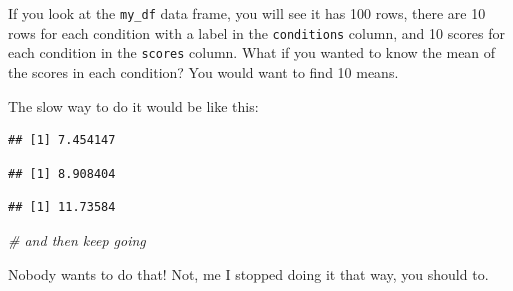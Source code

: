 \documentclass[
]{book}
\newenvironment{Shaded}{\begin{snugshade}}{\end{snugshade}}
\newcommand{\CommentTok}[1]{\textcolor[rgb]{0.56,0.35,0.01}{\textit{#1}}}
\newcommand{\FunctionTok}[1]{\textcolor[rgb]{0.00,0.00,0.00}{#1}}
\newcommand{\NormalTok}[1]{#1}
\newcommand{\SpecialCharTok}[1]{\textcolor[rgb]{0.00,0.00,0.00}{#1}}
\newcommand{\StringTok}[1]{\textcolor[rgb]{0.31,0.60,0.02}{#1}}
\begin{document}
If you look at the \texttt{my\_df} data frame, you will see it has 100 rows, there are 10 rows for each condition with a label in the \texttt{conditions} column, and 10 scores for each condition in the \texttt{scores} column. What if you wanted to know the mean of the scores in each condition? You would want to find 10 means.

The slow way to do it would be like this:

\begin{Shaded}
\end{Shaded}

\begin{verbatim}
## [1] 7.454147
\end{verbatim}

\begin{Shaded}
\end{Shaded}

\begin{verbatim}
## [1] 8.908404
\end{verbatim}

\begin{Shaded}
\end{Shaded}

\begin{verbatim}
## [1] 11.73584
\end{verbatim}

\begin{Shaded}
\begin{Highlighting}[]
\CommentTok{\# and then keep going}
\end{Highlighting}
\end{Shaded}

Nobody wants to do that! Not, me I stopped doing it that way, you should to.
\end{document}
